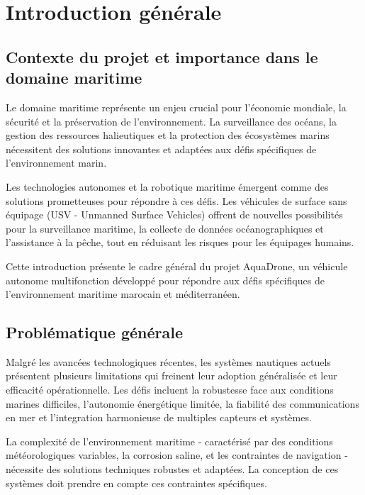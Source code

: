 \chapter[Introduction générale]{Introduction générale}
\label{cp:introduction-generale}

{
\parindent0pt

\section{Contexte du projet et importance dans le domaine maritime}
Le domaine maritime représente un enjeu crucial pour l'économie mondiale, la sécurité et la préservation de l'environnement. La surveillance des océans, la gestion des ressources halieutiques et la protection des écosystèmes marins nécessitent des solutions innovantes et adaptées aux défis spécifiques de l'environnement marin.

Les technologies autonomes et la robotique maritime émergent comme des solutions prometteuses pour répondre à ces défis. Les véhicules de surface sans équipage (USV - Unmanned Surface Vehicles) offrent de nouvelles possibilités pour la surveillance maritime, la collecte de données océanographiques et l'assistance à la pêche, tout en réduisant les risques pour les équipages humains.

\begin{block}[note]
Cette introduction présente le cadre général du projet AquaDrone, un véhicule autonome multifonction développé pour répondre aux défis spécifiques de l'environnement maritime marocain et méditerranéen.
\end{block}

\section{Problématique générale}
Malgré les avancées technologiques récentes, les systèmes nautiques actuels présentent plusieurs limitations qui freinent leur adoption généralisée et leur efficacité opérationnelle. Les défis incluent la robustesse face aux conditions marines difficiles, l'autonomie énergétique limitée, la fiabilité des communications en mer et l'\gls{integration} harmonieuse de multiples capteurs et systèmes.

La complexité de l'environnement maritime - caractérisé par des conditions météorologiques variables, la corrosion saline, et les contraintes de navigation - nécessite des solutions techniques robustes et adaptées. La \gls{conception} de ces systèmes doit prendre en compte ces contraintes spécifiques.

}
